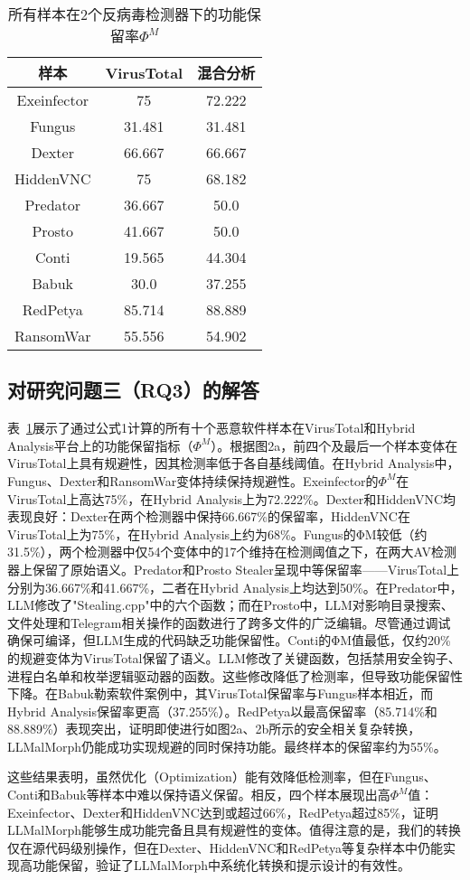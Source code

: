 \begin{table}[htbp]
	\centering
	\caption{所有样本在2个反病毒检测器下的功能保留率$\Phi^{M}$}
	\label{tab:5.3}
	\begin{tabular*}{\textwidth}{@{\extracolsep{\fill}}ccc}
		\toprule
		样本 & VirusTotal & 混合分析 \\
		\midrule
		Exeinfector & 75 & 72.222 \\
		Fungus & 31.481 & 31.481 \\
		Dexter & 66.667 & 66.667 \\
		HiddenVNC & 75 & 68.182 \\
		Predator & 36.667 & 50.0 \\
		Prosto & 41.667 & 50.0 \\
		Conti & 19.565 & 44.304 \\
		Babuk & 30.0 & 37.255 \\
		RedPetya & 85.714 & 88.889 \\
		RansomWar & 55.556 & 54.902 \\
		\bottomrule
	\end{tabular*}
\end{table}

\subsection{对研究问题三（RQ3）的解答}

表~\ref{tab:5.3}展示了通过公式1计算的所有十个恶意软件样本在VirusTotal和Hybrid Analysis平台上的功能保留指标（$\Phi^{M}$）。根据图2a，前四个及最后一个样本变体在VirusTotal上具有规避性，因其检测率低于各自基线阈值。在Hybrid Analysis中，Fungus、Dexter和RansomWar变体持续保持规避性。Exeinfector的$\Phi^{M}$在VirusTotal上高达75\%，在Hybrid Analysis上为72.222\%。Dexter和HiddenVNC均表现良好：Dexter在两个检测器中保持66.667\%的保留率，HiddenVNC在VirusTotal上为75\%，在Hybrid Analysis上约为68\%。Fungus的ΦM较低（约31.5\%），两个检测器中仅54个变体中的17个维持在检测阈值之下，在两大AV检测器上保留了原始语义。Predator和Prosto Stealer呈现中等保留率——VirusTotal上分别为36.667\%和41.667\%，二者在Hybrid Analysis上均达到50\%。在Predator中，LLM修改了"Stealing.cpp"中的六个函数；而在Prosto中，LLM对影响目录搜索、文件处理和Telegram相关操作的函数进行了跨多文件的广泛编辑。尽管通过调试确保可编译，但LLM生成的代码缺乏功能保留性。Conti的ΦM值最低，仅约20\%的规避变体为VirusTotal保留了语义。LLM修改了关键函数，包括禁用安全钩子、进程白名单和枚举逻辑驱动器的函数。这些修改降低了检测率，但导致功能保留性下降。在Babuk勒索软件案例中，其VirusTotal保留率与Fungus样本相近，而Hybrid Analysis保留率更高（37.255\%）。RedPetya以最高保留率（85.714\%和88.889\%）表现突出，证明即使进行如图2a、2b所示的安全相关复杂转换，LLMalMorph仍能成功实现规避的同时保持功能。最终样本的保留率约为55\%。

这些结果表明，虽然优化（Optimization）能有效降低检测率，但在Fungus、Conti和Babuk等样本中难以保持语义保留。相反，四个样本展现出高$\Phi^{M}$值：Exeinfector、Dexter和HiddenVNC达到或超过66\%，RedPetya超过85\%，证明LLMalMorph能够生成功能完备且具有规避性的变体。值得注意的是，我们的转换仅在源代码级别操作，但在Dexter、HiddenVNC和RedPetya等复杂样本中仍能实现高功能保留，验证了LLMalMorph中系统化转换和提示设计的有效性。